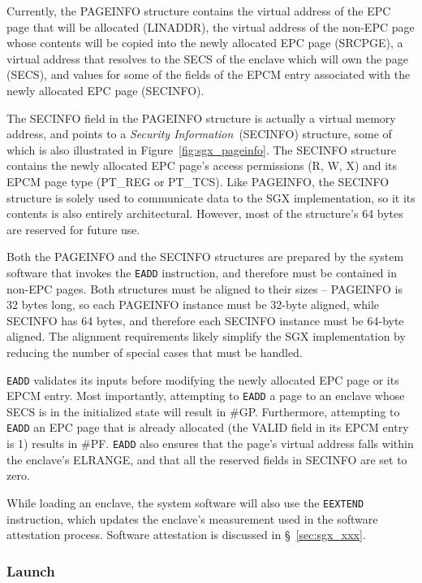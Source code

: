 Currently, the PAGEINFO structure contains the virtual address of the EPC page
that will be allocated (LINADDR), the virtual address of the non-EPC page whose
contents will be copied into the newly allocated EPC page (SRCPGE), a virtual
address that resolves to the SECS of the enclave which will own the page
(SECS), and values for some of the fields of the EPCM entry associated with the
newly allocated EPC page (SECINFO).

The SECINFO field in the PAGEINFO structure is actually a virtual memory
address, and points to a \textit{Security Information}~(SECINFO) structure,
some of which is also illustrated in Figure~\ref{fig:sgx_pageinfo}. The SECINFO
structure contains the newly allocated EPC page's access permissions (R, W, X)
and its EPCM page type (PT\_REG or PT\_TCS). Like PAGEINFO, the SECINFO
structure is solely used to communicate data to the SGX implementation, so it
its contents is also entirely architectural. However, most of the structure's
64 bytes are reserved for future use.

Both the PAGEINFO and the SECINFO structures are prepared by the system
software that invokes the \texttt{EADD} instruction, and therefore must be
contained in non-EPC pages. Both structures must be aligned to their sizes --
PAGEINFO is 32 bytes long, so each PAGEINFO instance must be 32-byte aligned,
while SECINFO has 64 bytes, and therefore each SECINFO instance must be
64-byte aligned. The alignment requirements likely simplify the SGX
implementation by reducing the number of special cases that must be handled.

\texttt{EADD} validates its inputs before modifying the newly allocated EPC
page or its EPCM entry. Most importantly, attempting to \texttt{EADD} a page to
an enclave whose SECS is in the initialized state will result in \#GP.
Furthermore, attempting to \texttt{EADD} an EPC page that is already allocated
(the VALID field in its EPCM entry is 1) results in \#PF. \texttt{EADD} also
ensures that the page's virtual address falls within the enclave's ELRANGE, and
that all the reserved fields in SECINFO are set to zero.

While loading an enclave, the system software will also use the
\texttt{EEXTEND} instruction, which updates the enclave's measurement used in
the software attestation process. Software attestation is discussed in
\S~\ref{sec:sgx_xxx}.


\subsubsection{Launch}
\label{sec:sgx_einit_overview}

